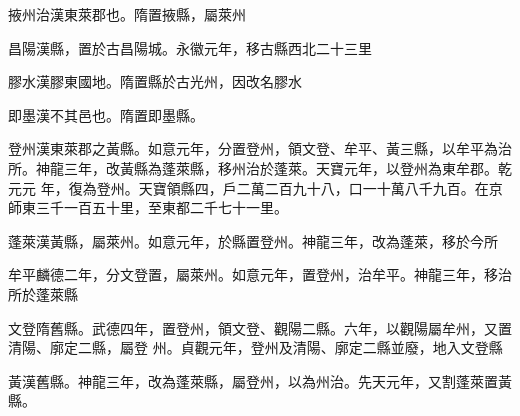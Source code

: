 \begin{pinyinscope}
 掖州治漢東萊郡也。隋置掖縣，屬萊州



 昌陽漢縣，置於古昌陽城。永徽元年，移古縣西北二十三里



 膠水漢膠東國地。隋置縣於古光州，因改名膠水



 即墨漢不其邑也。隋置即墨縣。



 登州漢東萊郡之黃縣。如意元年，分置登州，領文登、牟平、黃三縣，以牟平為治所。神龍三年，改黃縣為蓬萊縣，移州治於蓬萊。天寶元年，以登州為東牟郡。乾元元
 年，復為登州。天寶領縣四，戶二萬二百九十八，口一十萬八千九百。在京師東三千一百五十里，至東都二千七十一里。



 蓬萊漢黃縣，屬萊州。如意元年，於縣置登州。神龍三年，改為蓬萊，移於今所



 牟平麟德二年，分文登置，屬萊州。如意元年，置登州，治牟平。神龍三年，移治所於蓬萊縣



 文登隋舊縣。武德四年，置登州，領文登、觀陽二縣。六年，以觀陽屬牟州，又置清陽、廓定二縣，屬登
 州。貞觀元年，登州及清陽、廓定二縣並廢，地入文登縣



 黃漢舊縣。神龍三年，改為蓬萊縣，屬登州，以為州治。先天元年，又割蓬萊置黃縣。



\end{pinyinscope}